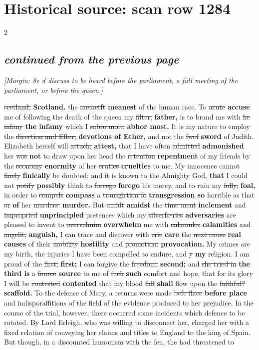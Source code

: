 \documentclass[10pt]{article}
\begin{document}
\section*{Historical source: scan row 1284}
\begin{multicols}{2}
\subsection*{\textit{continued from the previous page}}
{\small\itshape [Margin: 8e d discuss to be heard before the parliament, a full meeting of the parliament, or before the queen.]}\par
\sout{seetland,} \textbf{Scotland.} the \sout{menætft} \textbf{meanest} of the human race. To \sout{acute} \textbf{accuse} me of following the death of the queen my \sout{filter,} \textbf{father,} is to brand me with \sout{he infany} \textbf{the infamy} which I \sout{sabro molt.} \textbf{abhor most.} It is my nature to employ the \sout{direction and Efter,} \textbf{devotions of Ether,} and not the \sout{fwof} \textbf{sword} of Judith. Elizabeth herself will \sout{attach,} \textbf{attest,} that I have often \sout{admitted} \textbf{admonished} her \sout{was} \textbf{not} to draw upon her head the \sout{retention} \textbf{repentment} of my friends by the \sout{economy} \textbf{enormity} of her \sout{eruties} \textbf{cruelties} to me. My innocence cannot \sout{finely} \textbf{finically} be doubted; and it is known to the Almighty God, \textbf{that} I could not \sout{potify} \textbf{possibly} think to \sout{forcego} \textbf{forego} his mercy, and to ruin my \sout{folly,} \textbf{foal,} in order to \sout{compels} \textbf{compass} a \sout{transgirtion fo} \textbf{transgression so} horrible as that \sout{or} \textbf{of} her \sout{murders.} \textbf{murder.} But \sout{amidt} \textbf{amidst} the \sout{time ment} \textbf{inclement} and \sout{impropried} \textbf{unprincipled} pretences which my \sout{silverfa-ries} \textbf{adversaries} are pleased to invent to \sout{overvelmim} \textbf{overwhelm} me with \sout{calamules} \textbf{calamities} and \sout{angelit,} \textbf{anguish,} I can trace and discover with \sout{erie} \textbf{care} the \sout{next cause} \textbf{real causes} of their \sout{mobility} \textbf{hostility} and \sout{promotion.} \textbf{provocation.} My crimes are my birth, the injuries I have been compelled to endure, and \sout{y} \textbf{my} religion. I am proud of the \sout{first,} \textbf{first;} I can forgive the \sout{freedom,} \textbf{second;} and \sout{she tried in} \textbf{the third is} a \sout{fource} \textbf{source} to me of \sout{fuch} \textbf{such} comfort and hope, that for its glory I will be \sout{contested} \textbf{contented} that my blood \sout{fall} \textbf{shall} flow upon the \sout{faithful?} \textbf{scaffold.} To the defense of Mary, a returns were made \sout{befe flace} \textbf{before place} and indisporaffitions of the field of the evidence produced to her prejudice. In the course of the trial, however, there occurred some incidents which defence to be rotated. By Lord Erleigh, who was willing to disconnect her, charged her with a fixed relation of conveying her claims and titles to England to the king of Spain. But though, in a discounted humonism with the fen, the had threatened to 
\end{multicols}
\end{document}
